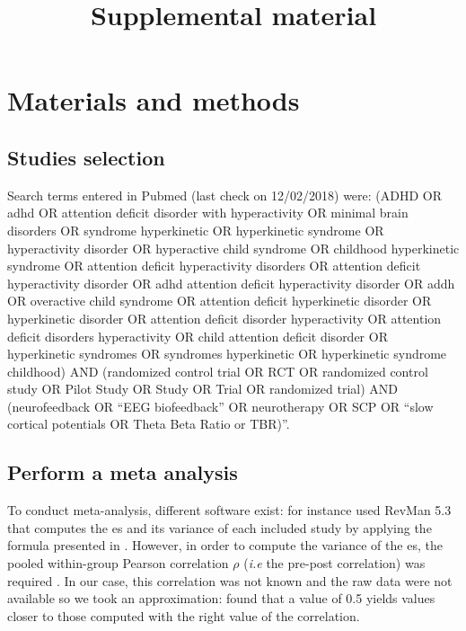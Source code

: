 \documentclass[12pt,a4paper,english]{article}
\begin{document}
\title{Supplemental material}
\date{}
\maketitle

\section{Materials and methods}

\subsection{Studies selection}

Search terms entered in Pubmed (last check on 12/02/2018) were: 
\guillemotleft (ADHD OR adhd OR attention deficit disorder with hyperactivity OR minimal brain disorders OR syndrome hyperkinetic OR hyperkinetic
syndrome OR hyperactivity disorder OR hyperactive child syndrome OR childhood hyperkinetic syndrome OR attention deficit hyperactivity disorders
OR attention deficit hyperactivity disorder OR adhd attention deficit hyperactivity disorder OR addh OR overactive child syndrome OR attention deficit hyperkinetic 
disorder OR hyperkinetic disorder OR attention deficit disorder hyperactivity OR attention deficit disorders hyperactivity OR child attention deficit disorder 
OR hyperkinetic syndromes OR syndromes hyperkinetic OR hyperkinetic syndrome childhood) AND (randomized control trial OR RCT OR randomized control study OR Pilot
Study OR Study OR Trial OR randomized trial) AND (neurofeedback OR “EEG biofeedback” OR neurotherapy OR SCP OR “slow cortical potentials OR Theta Beta Ratio or TBR)”\guillemotright.


\subsection{Perform a meta analysis}

To conduct meta-analysis, different software exist: for instance \citet{Cortese2016} used RevMan 5.3 \citep{RevMan} that computes the \gls{es} and its 
variance of each included study by applying the formula presented in \citet{Morris2008}. However, in order to compute the variance of the \gls{es}, 
the pooled within-group Pearson correlation $\rho$ (\textit{i.e} the pre-post correlation) was required 
\citep{James2013}. In our case, this correlation was not known and the raw data were not available so we took an
 approximation: \citet{Balk2012} found that a value of 0.5 yields values closer to those computed with the right value of the correlation. 
\end{document}
